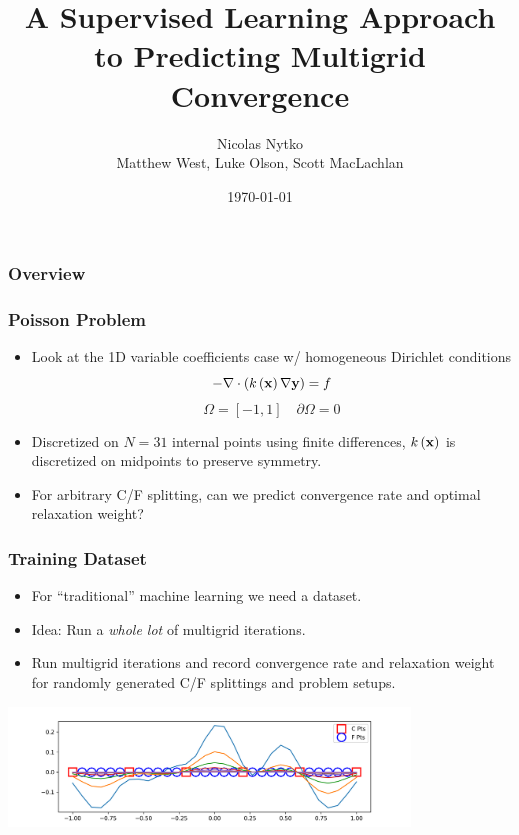 \documentclass[handout]{beamer}
\title{A Supervised Learning Approach to Predicting Multigrid Convergence}
\author[me]{Nicolas Nytko\\[3mm]Matthew West, Luke Olson, Scott MacLachlan}
\date{\today}
\renewcommand{\vec}[1]{ {\bf #1} }
\begin{document}
\frame{\titlepage}


\begin{frame}
  \frametitle{Overview}
\end{frame}


\begin{frame}
  \frametitle{Poisson Problem}
  \begin{itemize}
  \item Look at the 1D variable coefficients case w/ homogeneous Dirichlet conditions
    \[ -\nabla \cdot \left(k\left(\vec{x}\right) \nabla \vec{y} \right) = f \]
    \[ \Omega = \left[-1, 1\right] \quad \partial\Omega = 0 \]
  \item Discretized on $N=31$ internal points using finite differences, $k\left(\vec{x}\right)$ is discretized on midpoints to preserve symmetry.
  \item For arbitrary C/F splitting, can we predict convergence rate and optimal relaxation weight?
  \end{itemize}
\end{frame}


\begin{frame}
  \frametitle{Training Dataset}
  \begin{itemize}
  \item For ``traditional'' machine learning we need a dataset.
    \pause
  \item Idea: Run a \textit{whole lot} of multigrid iterations.
    \pause
  \item Run multigrid iterations and record convergence rate and relaxation weight for randomly generated C/F splittings and problem setups.
  \end{itemize}
  \begin{center}
    \includegraphics[width=0.8\textwidth]{figures/multigrid.png}
  \end{center}
\end{frame}
\end{document}
